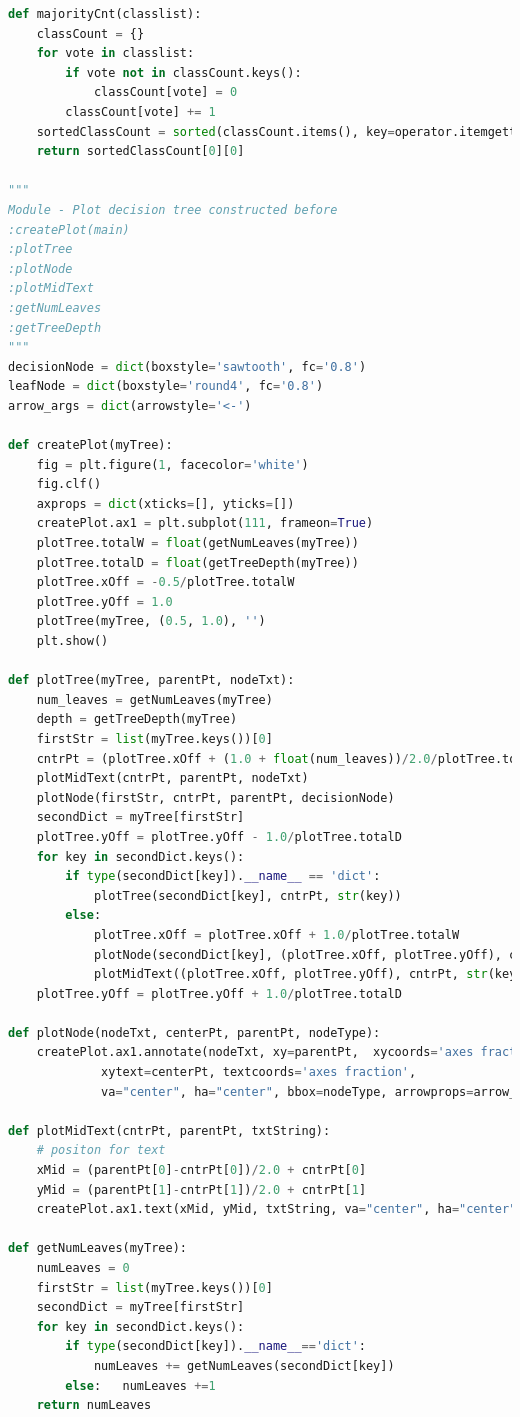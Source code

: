 \documentclass[UTF-8, a4paper, 10pt]{article}
\numberwithin{equation}{section}
\begin{document}
\begin{lstlisting}[language=python]
def majorityCnt(classlist):
    classCount = {}
    for vote in classlist:
        if vote not in classCount.keys():
            classCount[vote] = 0
        classCount[vote] += 1
    sortedClassCount = sorted(classCount.items(), key=operator.itemgetter(1), reverse=True)
    return sortedClassCount[0][0]

"""
Module - Plot decision tree constructed before
:createPlot(main)
:plotTree
:plotNode
:plotMidText
:getNumLeaves
:getTreeDepth
"""
decisionNode = dict(boxstyle='sawtooth', fc='0.8')
leafNode = dict(boxstyle='round4', fc='0.8')
arrow_args = dict(arrowstyle='<-')

def createPlot(myTree):
    fig = plt.figure(1, facecolor='white')
    fig.clf()
    axprops = dict(xticks=[], yticks=[])
    createPlot.ax1 = plt.subplot(111, frameon=True)
    plotTree.totalW = float(getNumLeaves(myTree))
    plotTree.totalD = float(getTreeDepth(myTree))
    plotTree.xOff = -0.5/plotTree.totalW
    plotTree.yOff = 1.0
    plotTree(myTree, (0.5, 1.0), '')
    plt.show()

def plotTree(myTree, parentPt, nodeTxt):
    num_leaves = getNumLeaves(myTree)
    depth = getTreeDepth(myTree)
    firstStr = list(myTree.keys())[0]
    cntrPt = (plotTree.xOff + (1.0 + float(num_leaves))/2.0/plotTree.totalW, plotTree.yOff)
    plotMidText(cntrPt, parentPt, nodeTxt)
    plotNode(firstStr, cntrPt, parentPt, decisionNode)
    secondDict = myTree[firstStr]
    plotTree.yOff = plotTree.yOff - 1.0/plotTree.totalD
    for key in secondDict.keys():
        if type(secondDict[key]).__name__ == 'dict':
            plotTree(secondDict[key], cntrPt, str(key))
        else:
            plotTree.xOff = plotTree.xOff + 1.0/plotTree.totalW
            plotNode(secondDict[key], (plotTree.xOff, plotTree.yOff), cntrPt, leafNode)
            plotMidText((plotTree.xOff, plotTree.yOff), cntrPt, str(key))
    plotTree.yOff = plotTree.yOff + 1.0/plotTree.totalD

def plotNode(nodeTxt, centerPt, parentPt, nodeType):
    createPlot.ax1.annotate(nodeTxt, xy=parentPt,  xycoords='axes fraction',
             xytext=centerPt, textcoords='axes fraction',
             va="center", ha="center", bbox=nodeType, arrowprops=arrow_args)

def plotMidText(cntrPt, parentPt, txtString):
    # positon for text
    xMid = (parentPt[0]-cntrPt[0])/2.0 + cntrPt[0]
    yMid = (parentPt[1]-cntrPt[1])/2.0 + cntrPt[1]
    createPlot.ax1.text(xMid, yMid, txtString, va="center", ha="center")

def getNumLeaves(myTree):
    numLeaves = 0
    firstStr = list(myTree.keys())[0]
    secondDict = myTree[firstStr]
    for key in secondDict.keys():
        if type(secondDict[key]).__name__=='dict':
            numLeaves += getNumLeaves(secondDict[key])
        else:   numLeaves +=1
    return numLeaves


\end{lstlisting}
\end{document}
